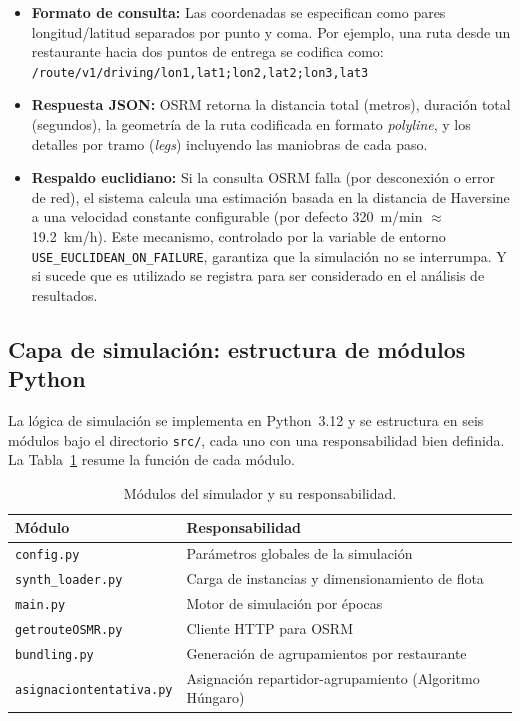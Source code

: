 \documentclass[12pt,letterpaper,oneside]{book}
\begin{document}
	\begin{itemize}
		\item \textbf{Formato de consulta:} Las coordenadas se especifican como pares longitud/latitud 
		separados por punto y coma. Por ejemplo, una ruta desde un restaurante hacia dos puntos de entrega 
		se codifica como:
		\texttt{/route/v1/driving/lon1,lat1;lon2,lat2;lon3,lat3}
		
		\item \textbf{Respuesta JSON:} OSRM retorna la distancia total (metros), duración total 
		(segundos), la geometría de la ruta codificada en formato \textit{polyline}, y los detalles 
		por tramo (\textit{legs}) incluyendo las maniobras de cada paso.
		
		\item \textbf{Respaldo euclidiano:} Si la consulta OSRM falla (por desconexión o error de red), el 
		sistema calcula una estimación basada en la distancia de Haversine a una velocidad constante 
		configurable (por defecto 320~m/min $\approx$ 19.2~km/h). Este mecanismo, controlado por la 
		variable de entorno \texttt{USE\_EUCLIDEAN\_ON\_FAILURE}, garantiza que la simulación no se 
		interrumpa. Y si sucede que es utilizado se registra para ser considerado en el análisis de resultados.
	\end{itemize}

\FloatBarrier
	\subsection{Capa de simulación: estructura de módulos Python}

	La lógica de simulación se implementa en Python~3.12 y se estructura en seis módulos bajo el 
	directorio \texttt{src/}, cada uno con una responsabilidad bien definida. La Tabla~\ref{tab:modulos} 
	resume la función de cada módulo.

	\begin{table}[htbp]
	\centering
	\caption{Módulos del simulador y su responsabilidad.}
	\label{tab:modulos}
	\begin{tabular}{@{}ll@{}}
	\toprule
	\textbf{Módulo} & \textbf{Responsabilidad} \\
	\midrule
	\texttt{config.py}              & Parámetros globales de la simulación \\
	\texttt{synth\_loader.py}       & Carga de instancias y dimensionamiento de flota \\
	\texttt{main.py}                & Motor de simulación por épocas \\
	\texttt{getrouteOSMR.py}        & Cliente HTTP para OSRM \\
	\texttt{bundling.py}            & Generación de agrupamientos por restaurante \\
	\texttt{asignaciontentativa.py} & Asignación repartidor-agrupamiento (Algoritmo Húngaro) \\
	\bottomrule
	\end{tabular}
	\end{table}
\end{document}
